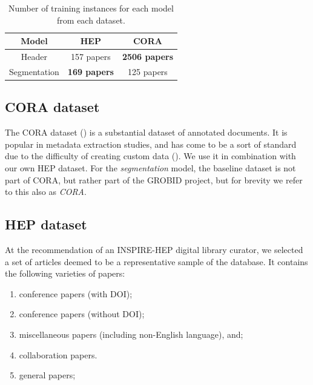 \begin{table}[h]
\begin{center}
\begin{tabular}{|c|c|c|}
\hline
Model & HEP & CORA \\
\hline
Header & 157 papers & \textbf{2506 papers} \\
\hline
Segmentation & \textbf{169 papers} & 125 papers \\
\hline
\end{tabular}
\caption[Number of training instances for each model from each dataset.]{Number of training instances for each model from each dataset.}
\label{table:hepvscora}
\end{center}
\end{table}

\subsection{CORA dataset}
\label{subsec:cora}
The CORA dataset (\cite{mccallum2000automating}) is a substantial dataset of annotated documents. It is popular in metadata extraction studies, and has come to be a sort of standard due to the difficulty of creating custom data (\cite{Peng04accurateinformation}). We use it in combination with our own HEP dataset. For the \emph{segmentation} model, the baseline dataset is not part of CORA, but rather part of the GROBID project, but for brevity we refer to this also as \emph{CORA}.

\subsection{HEP dataset}
\label{subsec:hepdataset}

At the recommendation of an INSPIRE-HEP digital library curator, we selected a set of articles deemed to be a representative sample of the database. It contains the following varieties of papers:

\begin{enumerate}
\item conference papers (with DOI);
\item conference papers (without DOI);
\item miscellaneous papers (including non-English language), and;
\item collaboration papers.
\item general papers;
\end{enumerate}

